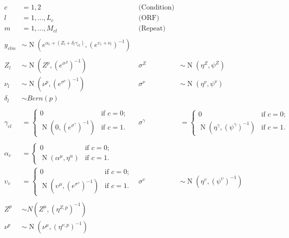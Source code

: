 \documentclass[11pt,a4paper]{article}
\begin{document}
\begin{align*}
c&=1,2 \qquad & \text{(Condition)}\\
l&=1,...,L_{c} \qquad & \text{(ORF)}\\
m&=1,...,M_{cl} \qquad & \text{(Repeat)}\\
\\
y_{clm} &\sim \operatorname{N}(e^{\alpha_{c}+(Z_{l}+\delta_{l}\gamma_{cl})},(e^{ \upsilon_{c}+\nu_{l}  })^{-1})\\
\\
Z_{l} &\sim \operatorname{N}(Z^{p},{(e^{\sigma^{Z}})}^{-1}) &\sigma^{Z} &\sim \operatorname{N}(\eta^{Z},\psi^{Z})\\
\nu_{l} &\sim \operatorname{N}(\nu^p,{ (e^{{\sigma}^{\nu}} )}^{-1} ) &\sigma^{\nu} &\sim \operatorname{N}(\eta^{\nu}, \psi^{\nu} )\\
\delta_{l} &\sim Bern(p)\\
\\
\gamma_{cl}&=\begin{cases}
0  & \text{if } c=0;\\
\operatorname{N}(0,{(e^{\sigma^{\gamma}})}^{-1}) & \text{if } c=1.
\end{cases}
&\sigma^{\gamma}&=\begin{cases}
0  & \text{if } c=0;\\
\operatorname{N}(\eta^{\gamma},{(\psi^{\gamma})}^{-1}) & \text{if } c=1.
\end{cases}\\
\\
\alpha_{c}&=\begin{cases}
0  & \text{if } c=0;\\
\operatorname{N}(\alpha^\mu,\eta^{\alpha}) & \text{if } c=1.
\end{cases}\\
\upsilon_{c}&=\begin{cases}
0  & \text{if } c=0;\\
\operatorname{N}(\upsilon^{\mu},({e^{\sigma^{\upsilon}}})^{-1}) & \text{if } c=1.
\end{cases}
&\sigma^{\upsilon} &\sim \operatorname{N}(\eta^{\upsilon}, (\psi^{\upsilon})^{-1} )\\
\\
Z^{p} &\sim N(Z^{\mu},{(\eta^{Z,p})}^{-1}) \\
\nu^p &\sim \operatorname{N}(\nu^{\mu}, (\eta^{\nu,p})^{-1} )
\end{align*}






\end{document}

